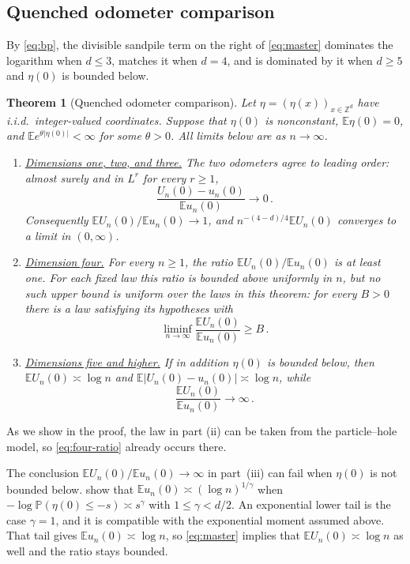 \documentclass[11pt]{amsart}
\theoremstyle{plain}
\newtheorem{theorem}{Theorem}[section]
\theoremstyle{definition}
\newcommand{\Z}{\mathbb{Z}}
\newcommand{\E}{\mathbb{E}}
\renewcommand{\P}{\mathbb{P}}
\begin{document}
\subsection{Quenched odometer comparison}\label{ssec:results-compare}
By \eqref{eq:bp}, the divisible sandpile term on the right of \eqref{eq:master} dominates the logarithm when $d\leq3$, matches it when $d=4$, and is dominated by it when $d\geq5$ and $\eta(0)$ is bounded below.
\begin{theorem}[Quenched odometer comparison]\label{thm:trichotomy}
	Let $\eta=(\eta(x))_{x\in\Z^d}$ have i.i.d.\ integer-valued coordinates.
	Suppose that $\eta(0)$ is nonconstant, $\E\eta(0)=0$, and
	$\E e^{\theta|\eta(0)|}<\infty$ for some $\theta>0$.
	All limits below are as $n\to\infty$.
	\begin{enumerate}[label=\textup{(\roman*)}]
		\item \underline{\textup{Dimensions one, two, and three.}}  The two
		odometers agree to leading order: almost surely and in $L^r$ for every
		$r\geq1$,
		\[
			\frac{U_n(0)-u_n(0)}{\E u_n(0)}\longrightarrow0\,.
		\]
		Consequently $\E U_n(0)/\E u_n(0)\to1$, and $n^{-(4-d)/4}\E U_n(0)$
		converges to a limit in $(0,\infty)$.

		\item \underline{\textup{Dimension four.}}  For every $n\geq1$, the
		ratio $\E U_n(0)/\E u_n(0)$ is at least one. For each fixed law this
		ratio is bounded above uniformly in $n$, but no such upper bound is
		uniform over the laws in this theorem: for every $B>0$ there is a law
		satisfying its hypotheses with
		\begin{equation}\label{eq:four-ratio}
			\liminf_{n\to\infty}\frac{\E U_n(0)}{\E u_n(0)}\geq B\,.
		\end{equation}

		\item \underline{\textup{Dimensions five and higher.}}  If in addition
		$\eta(0)$ is bounded below, then $\E U_n(0)\asymp\log n$ and
		$\E|U_n(0)-u_n(0)|\asymp\log n$, while
		\[
			\frac{\E U_n(0)}{\E u_n(0)}\longrightarrow\infty\,.
		\]
	\end{enumerate}
\end{theorem}

As we show in the proof, the law in part (ii) can be taken from the
particle--hole model, so \eqref{eq:four-ratio} already occurs there.

The conclusion $\E U_n(0)/\E u_n(0)\to\infty$ in part~\textup{(iii)} can fail when $\eta(0)$ is not bounded below.
\citet{BP} show that $\E u_n(0)\asymp(\log n)^{1/\gamma}$ when
$-\log\P(\eta(0)\leq-s)\asymp s^\gamma$ with $1\leq\gamma<d/2$. An exponential lower tail is the case $\gamma=1$, and it is compatible with the exponential moment assumed above. That tail gives $\E u_n(0)\asymp\log n$, so \eqref{eq:master} implies that $\E U_n(0)\asymp\log n$ as well and the ratio stays bounded.
\end{document}
